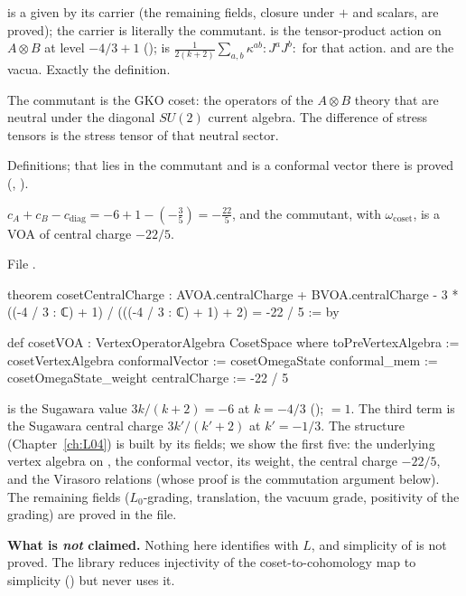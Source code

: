 \begin{dictionary}
 is a  given by its carrier (the remaining fields, closure under $+$ and scalars, are proved);
the carrier is literally the commutant.  is the tensor-product action on $A\otimes B$ at level $-4/3+1$
();  is $\frac{1}{2(k+2)}\sum_{a,b}\kappa^{ab}{:}J^aJ^b{:}$ for that action.
 and  are the vacua. Exactly the definition.
\end{dictionary}

\begin{physics}
The commutant is the GKO coset: the operators of the $A\otimes B$ theory that are neutral under the diagonal $SU(2)$ current algebra. The
difference of stress tensors is the stress tensor of that neutral sector.
\end{physics}

\begin{status}
Definitions; that  lies in the commutant and is a conformal vector there is proved (,
).
\end{status}

\begin{theorem}\label{l28:thm:cosetvoa}
$c_A+c_B-c_{\mathrm{diag}}=-6+1-(-\tfrac35)=-\tfrac{22}{5}$, and the commutant, with $\omega_{\mathrm{coset}}$, is a VOA of central charge
$-22/5$.
\end{theorem}

\noindent File .
\begin{leancode}
theorem cosetCentralCharge :
    AVOA.centralCharge + BVOA.centralCharge -
      3 * ((-4 / 3 : ℂ) + 1) / (((-4 / 3 : ℂ) + 1) + 2) = -22 / 5 := by

def cosetVOA : VertexOperatorAlgebra CosetSpace where
  toPreVertexAlgebra := cosetVertexAlgebra
  conformalVector := cosetOmegaState
  conformal_mem := cosetOmegaState_weight
  centralCharge := -22 / 5
\end{leancode}

\begin{dictionary}
 is the Sugawara value $3k/(k+2)=-6$ at $k=-4/3$ (); $=1$.
The third term is the Sugawara central charge $3k'/(k'+2)$ at $k'=-1/3$. The  structure
(Chapter~\ref{ch:L04}) is built by its fields; we show the first five: the underlying vertex algebra on , the conformal
vector, its weight, the central charge $-22/5$, and the Virasoro relations (whose proof is the commutation argument below). The remaining
fields ($L_0$-grading, translation, the vacuum grade, positivity of the grading) are proved in the file.

\textbf{What is \emph{not} claimed.} Nothing here identifies  with $L$, and simplicity of  is not proved.
The library reduces injectivity of the coset-to-cohomology map to simplicity
() but never uses it.
\end{dictionary}

